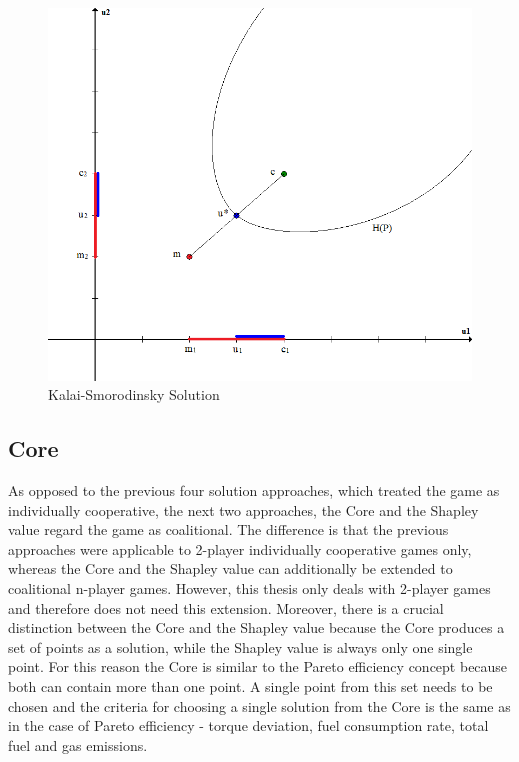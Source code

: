 {\begin{figure}[h]
\centering
\includegraphics[scale=0.4]{figures/kalaiSmorodinskySolution.png}
\caption{Kalai-Smorodinsky Solution}
\label{fig:ksSol}
\end{figure}

\subsection{Core}
\label{subsec:core}
As opposed to the previous four solution approaches, which treated the game as individually cooperative, the next two approaches, the Core and the Shapley value regard the game as coalitional. The difference is that the previous approaches were applicable to 2-player individually cooperative games only, whereas the Core and the Shapley value can additionally be extended to coalitional n-player games. However, this thesis only deals with 2-player games and therefore does not need this extension. Moreover, there is a crucial distinction between the Core and the Shapley value because the Core produces a set of points as a solution, while the Shapley value is always only one single point. For this reason the Core is similar to the Pareto efficiency concept because both can contain more than one point. A single point from this set needs to be chosen and the criteria for choosing a single solution from the Core is the same as in the case of Pareto efficiency - torque deviation, fuel consumption rate, total fuel and gas emissions.

}
